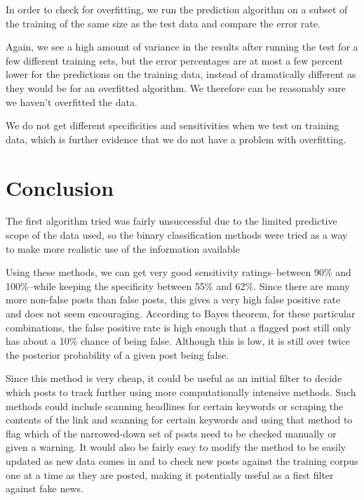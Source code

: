 \documentclass[12pt]{article}
\begin{document}
In order to check for overfitting, we run the prediction algorithm on a subset of the training of the same size as the test data and compare the error rate.

Again, we see a high amount of variance in the results after running the test for a few different training sets, but the error percentages are at most a few percent lower for the predictions on the training data, instead of dramatically different as they would be for an overfitted algorithm. We therefore can be reasonably sure we haven't overfitted the data.

We do not get different specificities and sensitivities when we test on training data, which is further evidence that we do not have a problem with overfitting.

\section*{Conclusion}

The first algorithm tried was fairly unsuccessful due to the limited predictive scope of the data used, so the binary classification methods were tried as a way to make more realistic use of the information available

Using these methods, we can get very good sensitivity ratings--between 90\% and 100\%--while keeping the specificity between 55\% and 62\%. Since there are many more non-false posts than false posts, this gives a very high false positive rate and does not seem encouraging. According to Bayes theorem, for these particular combinations, the false positive rate is high enough that a flagged post still only has about a 10\% chance of being false. Although this is low, it is still over twice the posterior probability of a given post being false.

Since this method is very cheap, it could be useful as an initial filter to decide which posts to track further using more computationally intensive methods. Such methods could include scanning headlines for certain keywords or scraping the contents of the link and scanning for certain keywords and using that method to flag which of the narrowed-down set of posts need to be checked manually or given a warning. It would also be fairly easy to modify the method to be easily updated as new data comes in and to check new posts against the training corpus one at a time as they are posted, making it potentially useful as a first filter against fake news.
\end{document}
